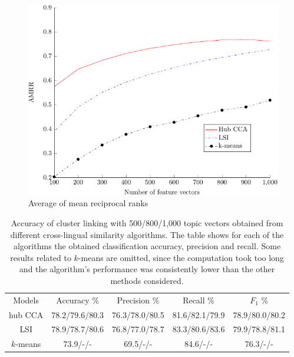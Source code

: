 \begin{figure}
\centering
\includegraphics{figures/retrieval.pdf}
\caption{Average of mean reciprocal ranks}
\label{pic:AMRR}
\end{figure}

\begin{table}[t]
\label{table:linkingEvalAlgos}
\begin{center}
\begin{tabular}{|c|c|c|c|c|}
  \hline
  \cline{1-5}
  Models & Accuracy \% & Precision \% & Recall \% & $F_1$ \% \\ \cline{1-5}
  hub CCA  & 78.2/79.6/80.3 & 76.3/78.0/80.5  & 81.6/82.1/79.9 & 78.9/80.0/80.2
  \\ \cline{1-5}
  LSI      & 78.9/78.7/80.6  & 76.8/77.0/78.7 & 83.3/80.6/83.6 & 79.9/78.8/81.1  \\ \cline{1-5}
 $k$-means & 73.9/-/- & 69.5/-/- & 84.6/-/- &  76.3/-/- \\ \cline{1-5}
\end{tabular}
\end{center}
\caption{Accuracy of cluster linking with 500/800/1,000 topic vectors obtained from
different cross-lingual similarity algorithms. The table shows for each of the algorithms
the obtained classification accuracy, precision and recall. Some results related to $k$-means
are omitted, since the computation took too long and the algorithm's performance was consistently
lower than the other methods considered.}
\end{table}

